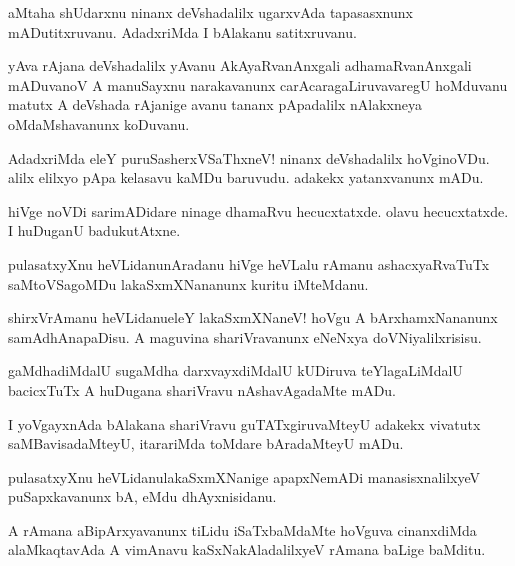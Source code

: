 \begin{mng}
aMtaha shUdarxnu ninanx deVshadalilx ugarxvAda tapasasxnunx mADutitxruvanu. AdadxriMda I bAlakanu satitxruvanu.
\end{mng}

\begin{mng}
yAva rAjana deVshadalilx yAvanu AkAyaRvanAnxgali adhamaRvanAnxgali mADuvanoV A manuSayxnu narakavanunx carAcaragaLiruvavaregU hoMduvanu matutx A deVshada rAjanige avanu tananx pApadalilx nAlakxneya oMdaMshavanunx koDuvanu.
\end{mng}

\begin{mng}
AdadxriMda eleY puruSasherxVSaThxneV! ninanx deVshadalilx hoVginoVDu. alilx elilxyo pApa kelasavu kaMDu baruvudu. adakekx yatanxvanunx mADu. 
\end{mng}

\begin{mng}
hiVge noVDi sarimADidare ninage dhamaRvu hecucxtatxde. olavu hecucxtatxde. I huDuganU badukutAtxne.
\end{mng}

\begin{mng}
pulasatxyXnu heVLidanu\mdash nAradanu hiVge heVLalu rAmanu ashacxyaRvaTuTx saMtoVSagoMDu lakaSxmXNananunx kuritu iMteMdanu.
\end{mng}

\begin{mng}
shirxVrAmanu heVLidanu\mdash eleY lakaSxmXNaneV! hoVgu A bArxhamxNananunx samAdhAnapaDisu. A maguvina shariVravanunx eNeNxya doVNiyalilxrisisu.
\end{mng}

\begin{mng}
gaMdhadiMdalU sugaMdha darxvayxdiMdalU kUDiruva teYlagaLiMdalU bacicxTuTx A huDugana shariVravu nAshavAgadaMte mADu.
\end{mng}

\begin{mng}
I yoVgayxnAda bAlakana shariVravu guTATxgiruvaMteyU adakekx vivatutx saMBavisadaMteyU, itarariMda toMdare bAradaMteyU mADu.
\end{mng}

\begin{mng}
pulasatxyXnu heVLidanu\mdash lakaSxmXNanige apapxNemADi manasisxnalilxyeV puSapxkavanunx bA, eMdu dhAyxnisidanu.
\end{mng}

\begin{mng}
A rAmana aBipArxyavanunx tiLidu iSaTxbaMdaMte hoVguva cinanxdiMda alaMkaqtavAda A vimAnavu kaSxNakAladalilxyeV rAmana baLige baMditu.
\end{mng}

